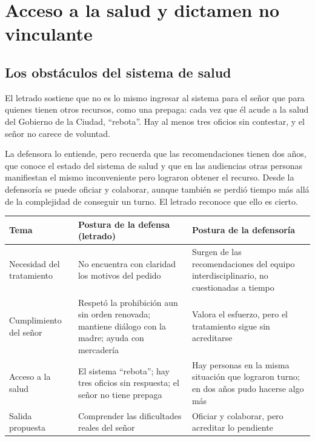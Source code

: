 \documentclass[12pt,oneside]{book}
\begin{document}
\section{Acceso a la salud y dictamen no vinculante}

\subsection{Los obst\'aculos del sistema de salud}

El letrado sostiene que no es lo mismo ingresar al sistema para el se\~nor que para quienes tienen otros recursos, como una prepaga: cada vez que \'el acude a la salud del Gobierno de la Ciudad, ``rebota''. Hay al menos tres oficios sin contestar, y el se\~nor no carece de voluntad.

La defensora lo entiende, pero recuerda que las recomendaciones tienen dos a\~nos, que conoce el estado del sistema de salud y que en las audiencias otras personas manifiestan el mismo inconveniente pero lograron obtener el recurso. Desde la defensor\'ia se puede oficiar y colaborar, aunque tambi\'en se perdi\'o tiempo m\'as all\'a de la complejidad de conseguir un turno. El letrado reconoce que ello es cierto.

\begin{table}[H]
\centering
\small
\begin{tabularx}{\textwidth}{>{\raggedright\arraybackslash}p{} >{\raggedright\arraybackslash}X >{\raggedright\arraybackslash}X}
\toprule
\textbf{Tema} & \textbf{Postura de la defensa (letrado)} & \textbf{Postura de la defensor\'ia} \\
\midrule
Necesidad del tratamiento & No encuentra con claridad los motivos del pedido & Surgen de las recomendaciones del equipo interdisciplinario, no cuestionadas a tiempo \\
Cumplimiento del se\~nor & Respet\'o la prohibici\'on aun sin orden renovada; mantiene di\'alogo con la madre; ayuda con mercader\'ia & Valora el esfuerzo, pero el tratamiento sigue sin acreditarse \\
Acceso a la salud & El sistema ``rebota''; hay tres oficios sin respuesta; el se\~nor no tiene prepaga & Hay personas en la misma situaci\'on que lograron turno; en dos a\~nos pudo hacerse algo m\'as \\
Salida propuesta & Comprender las dificultades reales del se\~nor & Oficiar y colaborar, pero acreditar lo pendiente \\
\bottomrule
\end{tabularx}
\end{table}
\end{document}
